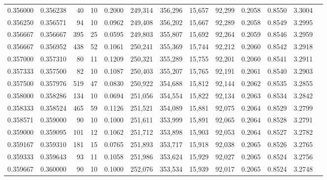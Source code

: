 \begin{tabular}{rrrrrrrrrrrrr}
0.356000 & 0.356238 &    40 &  10 &                                     0.2000 & 249,314 & 356,296 &  15,657 &  92,299 & 0.2058 & 0.8550 & 3.3004 \\
0.356250 & 0.356571 &    94 &  10 &                                     0.0962 & 249,408 & 356,202 &  15,667 &  92,289 & 0.2058 & 0.8549 & 3.2995 \\
0.356667 & 0.356667 &   395 &  25 &                                     0.0595 & 249,803 & 355,807 &  15,692 &  92,264 & 0.2059 & 0.8546 & 3.2959 \\
0.356667 & 0.356952 &   438 &  52 &                                     0.1061 & 250,241 & 355,369 &  15,744 &  92,212 & 0.2060 & 0.8542 & 3.2918 \\
0.357000 & 0.357310 &    80 &  11 &                                     0.1209 & 250,321 & 355,289 &  15,755 &  92,201 & 0.2060 & 0.8541 & 3.2911 \\
0.357333 & 0.357500 &    82 &  10 &                                     0.1087 & 250,403 & 355,207 &  15,765 &  92,191 & 0.2061 & 0.8540 & 3.2903 \\
0.357500 & 0.357976 &   519 &  47 &                                     0.0830 & 250,922 & 354,688 &  15,812 &  92,144 & 0.2062 & 0.8535 & 3.2855 \\
0.358000 & 0.358286 &   134 &  10 &                                     0.0694 & 251,056 & 354,554 &  15,822 &  92,134 & 0.2063 & 0.8534 & 3.2842 \\
0.358333 & 0.358524 &   465 &  59 &                                     0.1126 & 251,521 & 354,089 &  15,881 &  92,075 & 0.2064 & 0.8529 & 3.2799 \\
0.358571 & 0.359000 &    90 &  10 &                                     0.1000 & 251,611 & 353,999 &  15,891 &  92,065 & 0.2064 & 0.8528 & 3.2791 \\
0.359000 & 0.359095 &   101 &  12 &                                     0.1062 & 251,712 & 353,898 &  15,903 &  92,053 & 0.2064 & 0.8527 & 3.2782 \\
0.359167 & 0.359310 &   181 &  15 &                                     0.0765 & 251,893 & 353,717 &  15,918 &  92,038 & 0.2065 & 0.8526 & 3.2765 \\
0.359333 & 0.359643 &    93 &  11 &                                     0.1058 & 251,986 & 353,624 &  15,929 &  92,027 & 0.2065 & 0.8524 & 3.2756 \\
0.359667 & 0.360000 &    90 &  10 &                                     0.1000 & 252,076 & 353,534 &  15,939 &  92,017 & 0.2065 & 0.8524 & 3.2748 \\

\end{tabular}

